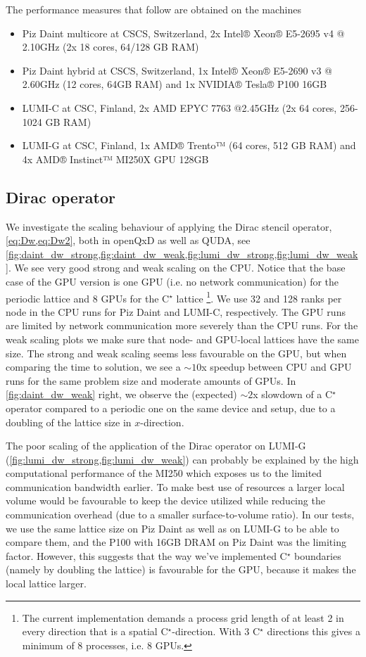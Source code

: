 The performance measures that follow are obtained on the machines
\begin{itemize}
    \item Piz Daint multicore at CSCS, Switzerland, 2x Intel® Xeon® E5-2695 v4 @ 2.10GHz (2x 18 cores, 64/128 GB RAM)
    \item Piz Daint hybrid at CSCS, Switzerland, 1x Intel® Xeon® E5-2690 v3 @ 2.60GHz (12 cores, 64GB RAM) and 1x NVIDIA® Tesla® P100 16GB
    \item LUMI-C at CSC, Finland, 2x AMD EPYC 7763 @2.45GHz (2x 64 cores, 256-1024 GB RAM)
    \item LUMI-G at CSC, Finland, 1x AMD® Trento™ (64 cores, 512 GB RAM) and 4x AMD® Instinct™ MI250X GPU 128GB
\end{itemize}

\subsection{Dirac operator}

We investigate the scaling behaviour of applying the Dirac stencil operator, \cref{eq:Dw,eq:Dw2}, both in openQxD as well as  QUDA, see \cref{fig:daint_dw_strong,fig:daint_dw_weak,fig:lumi_dw_strong,fig:lumi_dw_weak}. We see very good strong and weak scaling on the CPU. Notice that the base case of the GPU version is one GPU (i.e. no network communication) for the periodic lattice and 8 GPUs for the C$^\star$ lattice \footnote{The current implementation demands a process grid length of at least 2 in every direction that is a spatial C$^\star$-direction. With 3 C$^\star$ directions this gives a minimum of 8 processes, i.e. 8 GPUs.}. We use 32 and 128 ranks per node in the CPU runs for Piz Daint and LUMI-C, respectively. The GPU runs are limited by network communication more severely than the CPU runs. For the weak scaling plots we make sure that node- and GPU-local lattices have the same size. The strong and weak scaling seems less favourable on the GPU, but when comparing the time to solution, we see a $\sim10$x speedup between CPU and GPU runs for the same problem size and moderate amounts of GPUs. In \cref{fig:daint_dw_weak} right, we observe the (expected) $\sim2$x slowdown of a C$^\star$ operator compared to a periodic one on the same device and setup, due to a doubling of the lattice size in $x$-direction.

The poor scaling of the application of the Dirac operator on LUMI-G (\cref{fig:lumi_dw_strong,fig:lumi_dw_weak}) can probably be explained by the high computational performance of the MI250 which exposes us to the limited communication bandwidth earlier. To make best use of resources a larger local volume would be favourable to keep the device utilized while reducing the communication overhead (due to a smaller surface-to-volume ratio). In our tests, we use the same lattice size on Piz Daint as well as on LUMI-G to be able to compare them, and the P100 with 16GB DRAM on Piz Daint was the limiting factor. However, this suggests that the way we've implemented C$^\star$ boundaries (namely by doubling the lattice) is favourable for the GPU, because it makes the local lattice larger.

